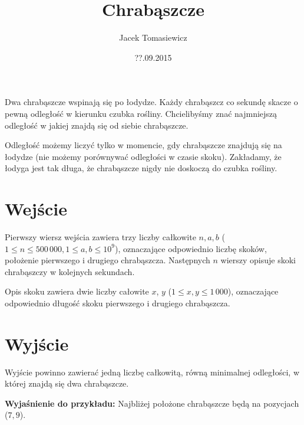 \documentclass[zad,zawodnik,utf8]{sinol}
\title{Chrabąszcze}
\author{Jacek Tomasiewicz}
\date{??.09.2015}
\begin{document}
  \begin{tasktext}%
Dwa chrabąszcze wspinają się po łodydze. Każdy chrabąszcz co sekundę skacze o pewną  odległość w kierunku czubka rośliny. Chcielibyśmy znać najmniejszą odległość w jakiej znajdą się od siebie chrabąszcze.

Odległość możemy liczyć tylko w  momencie, gdy chrabąszcze znajdują się na łodydze (nie możemy porównywać odległości w czasie skoku). Zakładamy, że łodyga jest tak długa, że chrabąszcze nigdy nie doskoczą do czubka  rośliny.

  \section{Wejście}
	Pierwszy wiersz wejścia zawiera trzy liczby całkowite $n, a, b$ ($1 \leq n \leq  500\,000, 1 \leq a, b \leq 10^9$), oznaczające odpowiednio liczbę skoków, położenie  pierwszego i drugiego chrabąszcza. Następnych $n$ wierszy opisuje skoki chrabąszczy w  kolejnych sekundach.

Opis skoku zawiera dwie liczby całowite $x$, $y$ ($1 \leq x, y \leq 1\,000$), oznaczające odpowiednio długość skoku  pierwszego i drugiego chrabąszcza.

  \section{Wyjście}
Wyjście powinno zawierać jedną liczbę całkowitą, równą minimalnej odległości, w której  znajdą się dwa chrabąszcze.

     \makecompactexample

\medskip
\noindent
\textbf{Wyjaśnienie do przykładu:} Najbliżej położone chrabąszcze będą na pozycjach ($7,9$).

  \end{tasktext}
\end{document}
